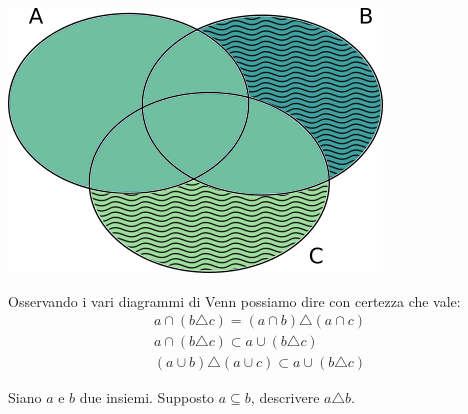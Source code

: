 \begin{center}
\begin{minipage}{.45\textwidth}
	\end{minipage}
	\begin{minipage}{.45\textwidth}
		\centering
		\includegraphics[scale=.5]{res/Venn_Esercizio9.png}
	\end{minipage}
\end{center}
Osservando i vari diagrammi di Venn possiamo dire con certezza che vale:
\begin{displaymath}
	\begin{array}{l}
		a \cap (b \triangle c) = (a \cap b) \triangle (a \cap c)  \\
		a \cap (b \triangle c) \subset a \cup (b \triangle c) \\
		(a \cup b) \triangle (a \cup c) \subset  a \cup (b \triangle c)
	\end{array}
\end{displaymath}
\hfill \blacksquare
\begin{exsbox}
	Siano $a$ e $b$ due insiemi. Supposto $a \subseteq b$, descrivere $a \triangle b$.
\end{exsbox}

